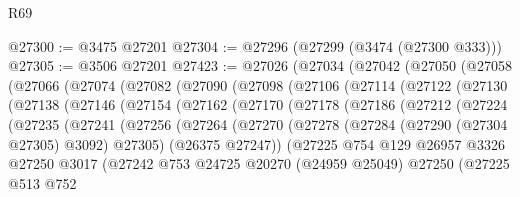 \begin{lexlean}{R69}
\begin{coremodule}
@27300 := @3475 @27201
@27304 := @27296 (@27299 (@3474 (@27300 @333)))
@27305 := @3506 @27201
@27423 := @27026
    (@27034
      (@27042
        (@27050
          (@27058
            (@27066
              (@27074
                (@27082
                  (@27090
                    (@27098
                      (@27106
                        (@27114
                          (@27122
                            (@27130
                              (@27138
                                (@27146
                                  (@27154
                                    (@27162
                                      (@27170
                                        (@27178
                                          (@27186
                                            (@27212
                                              (@27224
                                                (@27235
                                                  (@27241
                                                    (@27256
                                                      (@27264
                                                        (@27270
                                                          (@27278
                                                            (@27284
                                                              (@27290 (@27304 @27305) @3092)
                                                              @27305)
                                                            (@26375 @27247))
                                                          (@27225
                                                            @754
                                                            @129
                                                            @26957
                                                            @3326
                                                            @27250
                                                            @3017
                                                            (@27242
                                                              @753
                                                              @24725
                                                              @20270
                                                              (@24959 @25049)
                                                              @27250
                                                              (@27225
                                                                @513
                                                                @752

\end{coremodule}
\end{lexlean}
